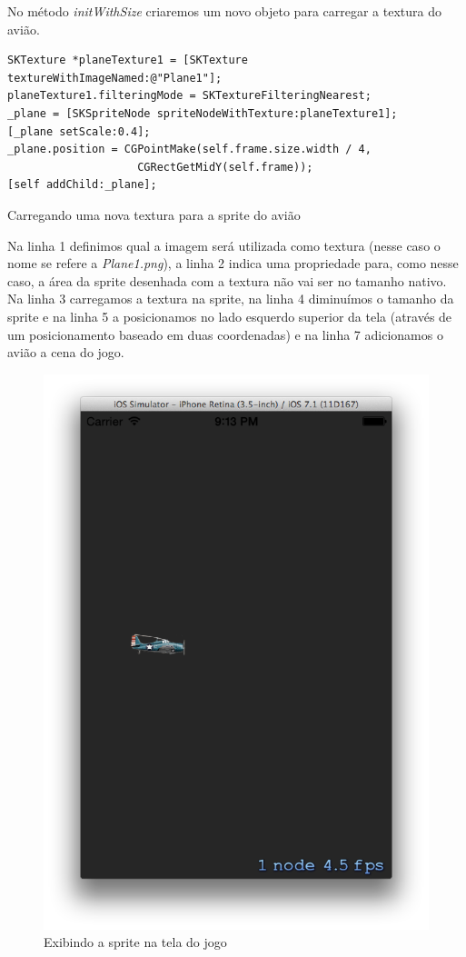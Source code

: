 \documentclass[a4paper,12pt,brazil,oneside]{book}
\begin{document}
No método \emph{initWithSize} criaremos um novo objeto para carregar a textura do avião.

\begin{listing}[H]
\begin{verbatim}
SKTexture *planeTexture1 = [SKTexture textureWithImageNamed:@"Plane1"];
planeTexture1.filteringMode = SKTextureFilteringNearest;
_plane = [SKSpriteNode spriteNodeWithTexture:planeTexture1];
[_plane setScale:0.4];
_plane.position = CGPointMake(self.frame.size.width / 4, 
					CGRectGetMidY(self.frame));
[self addChild:_plane];
\end{verbatim}
\caption{Carregando uma nova textura para a sprite do avião}
\end{listing}

Na linha 1 definimos qual a imagem será utilizada como textura (nesse caso o nome se refere a \emph{Plane1.png}), a linha 2 indica uma propriedade para, como nesse caso, a área da sprite desenhada com a textura não vai ser no tamanho nativo.
Na linha 3 carregamos a textura na sprite, na linha 4 diminuímos o tamanho da sprite e na linha 5 a posicionamos no lado esquerdo superior da tela (através de um posicionamento baseado em duas coordenadas) e na linha 7 adicionamos o avião a cena do jogo.

\begin{figure}[H]
  \centering
  \includegraphics[width=.75\textwidth]{figuras/6/plane4.png}
  \caption{Exibindo a sprite na tela do jogo}
  \label{fig:a}
\end{figure}
\end{document}
